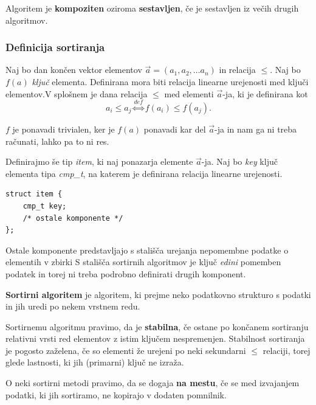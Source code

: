 \documentclass[a4paper,oneside]{article}
\begin{document}
\begin{definicija}
  Algoritem je \textbf{kompoziten} oziroma \textbf{sestavljen}, če je sestavljen iz večih
  drugih algoritmov.
\end{definicija}


\subsubsection{Definicija sortiranja}
Naj bo dan končen vektor elementov $\vec{a} = \left(a_1, a_2, \ldots a_n \right)$ in relacija $\leq$.
Naj bo $f(a)$ \emph{ključ} elementa. Definirana mora biti relacija linearne urejenosti med 
ključi elementov.V splošnem je dana relacija $\leq$ med elementi $\vec{a}$-ja, ki je definirana kot 
\[a_i \leq a_j \overset{def}{\Longleftrightarrow} f(a_i) \leq f(a_j). \]

$f$ je ponavadi trivialen, ker je $f(a)$ ponavadi kar del $\vec{a}$-ja in nam ga ni treba
računati, lahko pa to ni res. 

Definirajmo še tip \emph{item}, ki naj ponazarja elemente $\vec{a}$-ja. Naj bo \emph{key}
ključ elementa tipa \emph{cmp\_t}, na katerem je definirana relacija linearne urejenosti.

\begin{lstlisting}
struct item {
    cmp_t key;
    /* ostale komponente */
};
\end{lstlisting}

Ostale komponente predstavljajo s stališča urejanja nepomembne podatke o elementih v zbirki
S stališča sortirnih algoritmov je ključ \emph{edini} pomemben podatek in torej ni treba
podrobno definirati drugih komponent.

\begin{definicija}
  \textbf{Sortirni algoritem} je algoritem, ki prejme neko podatkovno strukturo s podatki
  in jih uredi po nekem vrstnem redu.
\end{definicija}

\begin{definicija}
  Sortirnemu algoritmu pravimo, da je \textbf{stabilna}, če ostane po končanem sortiranju
  relativni vrsti red elementov z istim ključem nespremenjen.
  Stabilnost sortiranja je pogosto zaželena, če so elementi že urejeni po neki
  sekundarni $\leq$ relaciji, torej glede lastnosti, ki jih (primarni) ključ ne izraža.
\end{definicija}

\begin{definicija}
  O neki sortirni metodi pravimo, da se dogaja \textbf{na mestu}, če se med izvajanjem podatki, ki
  jih sortiramo, ne kopirajo v dodaten pomnilnik.
\end{definicija}
\end{document}
